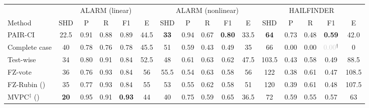 \begin{tabular}{lccccccccccccccc}
    \toprule
     & \multicolumn{5}{c}{ALARM (linear)} & \multicolumn{5}{c}{ALARM (nonlinear)} & \multicolumn{5}{c}{HAILFINDER} \\
    \cmidrule(lr){2-6} \cmidrule(lr){7-11} \cmidrule(lr){12-16}
    Method & SHD & P & R & F1 & E & SHD & P & R & F1 & E & SHD & P & R & F1 & E \\
    \midrule
    PAIR-CI                                       & 22.5 & 0.91 & 0.88 & 0.89 & 44.5 & \textbf{33} & 0.94 & 0.67 & \textbf{0.80} & 33.5 & \textbf{64} & 0.73 & 0.48 & \textbf{0.59} & 42.0 \\
    Complete case                                 & 40 & 0.78 & 0.76 & 0.78 & 45.5 & 51 & 0.59 & 0.43 & 0.49 & 35 & 66 & 0.00 & 0.00 & \textcolor{lightgray}{0.00}$^\dagger$ & 0 \\
    Test-wise                                     & 34 & 0.80 & 0.91 & 0.84 & 52.5 & 48 & 0.61 & 0.63 & 0.62 & 47.5 & 103.5 & 0.43 & 0.58 & 0.49 & 88.5 \\
    FZ-vote                                       & 36 & 0.76 & 0.93 & 0.84 & 56 & 55.5 & 0.54 & 0.63 & 0.58 & 56 & 122 & 0.38 & 0.61 & 0.47 & 108.5 \\
    FZ-Rubin (\citeauthor{witte2022multiple})     & 35 & 0.77 & 0.93 & 0.84 & 55 & 53 & 0.55 & 0.62 & 0.58 & 51 & 120 & 0.39 & 0.61 & 0.48 & 107.5 \\
    MVPC$^\ddagger$ (\citeauthor{tu2019causal})   & \textbf{20} & 0.95 & 0.91 & \textbf{0.93} & 44 & 40 & 0.75 & 0.59 & 0.65 & 36.5 & 72 & 0.59 & 0.55 & 0.57 & 63 \\
    \bottomrule
\end{tabular}
